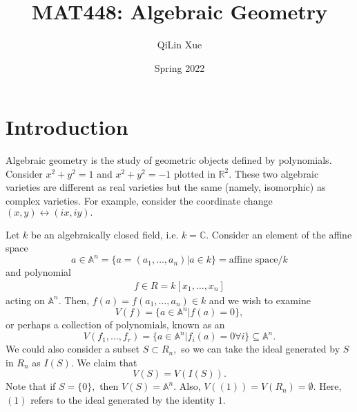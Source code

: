 \documentclass{article}
\title{MAT448: Algebraic Geometry}
\author{QiLin Xue}
\date{Spring 2022}
\numberwithin{equation}{section}
\begin{document}
\maketitle
\tableofcontents
\newpage
\section{Introduction}
Algebraic geometry is the study of geometric objects defined by polynomials. Consider $x^2+y^2=1$ and $x^2+y^2=-1$ plotted in $\mathbb{R}^2.$ These two algebraic varieties are different as real varieties but the same (namely, isomorphic) as complex varieties. For example, consider the coordinate change $(x,y) \leftrightarrow (ix,iy).$

Let $k$ be an algebraically closed field, i.e. $k=\mathbb{C}.$ Consider an element of the affine space 
\begin{equation}
    a \in \mathbb{A}^n = \{a=(a_1,\dots,a_n)|a\in k\} = \text{affine space}/k
\end{equation}
and polynomial
\begin{align}
    f \in R = k[x_1,\dots,x_n]
\end{align}
acting on $\mathbb{A}^n.$ Then, $f(a) = f(a_1,\dots,a_n) \in k$ and we wish to examine 
\begin{equation}
    V(f) = \{a\in \mathbb{A}^n | f(a)=0\},
\end{equation}
or perhaps a collection of polynomials, known as an 
\begin{equation}
    V(f_1,\dots,f_r) = \{a\in \mathbb{A}^n | f_i(a) =0\forall i\} \subseteq \mathbb{A}^n.
\end{equation}
We could also consider a subset $S\subset R_n,$ so we can take the ideal generated by $S$ in $R_n$ as $I(S).$ We claim that 
\begin{equation}
    V(S) = V(I(S)).
\end{equation}
Note that if $S=\{0\},$ then $V(S)=\mathbb{A}^n.$ Also, $V((1))=V(R_n)=\emptyset.$ Here, $(1)$ refers to the ideal generated by the identity $1.$
\end{document}
